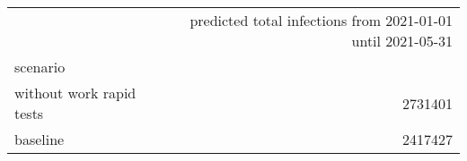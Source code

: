 \begin{tabular}{lr}
\toprule
{} &  predicted total infections from 2021-01-01 until 2021-05-31 \\
scenario                  &                                                              \\
\midrule
 without work rapid tests &                                            2731401 \\
 baseline                 &                                            2417427 \\
\bottomrule
\end{tabular}
